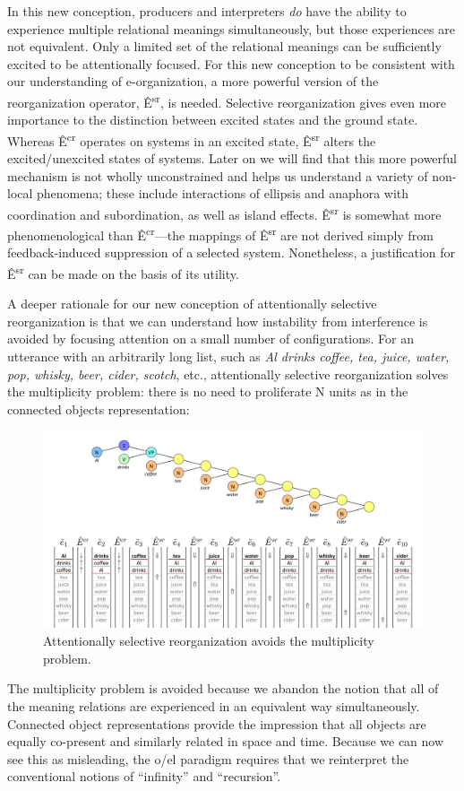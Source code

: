   In this new conception, producers and interpreters \textit{do} have the ability to experience multiple relational meanings simultaneously, but those experiences are not equivalent. Only a limited set of the relational meanings can be sufficiently excited to be attentionally focused. For this new conception to be consistent with our understanding of e-organization, a more powerful version of the reorganization operator, Ê\textsuperscript{sr},  is needed. Selective reorganization gives even more importance to the distinction between excited states and the ground state. Whereas Ê\textsuperscript{cr} operates on systems in an excited state, Ê\textsuperscript{sr} alters the excited/unexcited states of systems. Later on we will find that this more powerful mechanism is not wholly unconstrained and helps us understand a variety of non-local phenomena; these include interactions of ellipsis and anaphora with coordination and subordination, as well as island effects. Ê\textsuperscript{sr} is somewhat more phenomenological than Ê\textsuperscript{cr}—the mappings of Ê\textsuperscript{sr} are not derived simply from feedback-induced suppression of a selected system. Nonetheless, a justification for Ê\textsuperscript{sr} can be made on the basis of its utility.

  A deeper rationale for our new conception of attentionally selective reorganization is that we can understand how instability from interference is avoided by focusing attention on a small number of configurations.  For an utterance with an arbitrarily long list, such as \textit{Al drinks coffee, tea, juice, water, pop, whisky, beer, cider, scotch}, etc., attentionally selective reorganization solves the multiplicity problem: there is no need to proliferate N units as in the connected objects representation: 

  
\begin{figure}
\includegraphics[width=\textwidth]{figures/Tilsen-img104.png}
\caption{Attentionally selective reorganization avoids the multiplicity problem.}
\label{fig:4:54}
\end{figure}
 

  The multiplicity problem is avoided because we abandon the notion that all of the meaning relations are experienced in an equivalent way simultaneously. Connected object representations provide the impression that all objects are equally co-present and similarly related in space and time. Because we can now see this as misleading, the o/el paradigm requires that we reinterpret the conventional notions of “infinity” and “recursion”.

